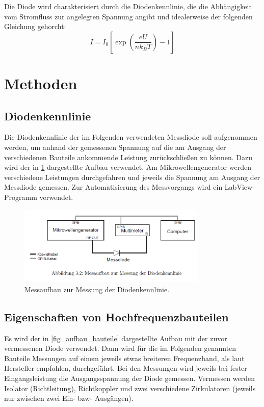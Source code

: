 \documentclass[
	a4paper,
	12pt,
	pagesize,
	ngerman
]{scrartcl}
\begin{document}
	Die Diode wird charakterisiert durch die Diodenkennlinie, die die Abhängigkeit vom Stromfluss zur angelegten Spannung angibt und idealerweise der folgenden Gleichung gehorcht:
	\begin{equation}
		\label{eq_diode_ideal}
		I = I_0 \left[ \exp \left( \frac{eU}{n k_B T} \right) -1 \right] %
	\end{equation}


	\section{Methoden}

	\subsection{Diodenkennlinie}
	Die Diodenkennlinie der im Folgenden verwendeten Messdiode soll aufgenommen werden, um anhand der gemessenen Spannung auf die am Ausgang der verschiedenen Bauteile ankommende Leistung zurückschließen zu können.
	Dazu wird der in \cref{fig_aufbau_kennlinie} dargestellte Aufbau verwendet.
	Am Mikrowellengenerator werden verschiedene Leistungen durchgefahren und jeweils die Spannung am Ausgang der Messdiode gemessen.
	Zur Automatisierung des Messvorgangs wird ein LabView-Programm verwendet.

	\begin{figure}[H]
		\includegraphics[width=0.8\textwidth]{img/aufbau_kennlinie.png}
		\centering
		\caption{
		 	Messaufbau zur Messung der Diodenkennlinie. \cite{Anleitung}
		}
		\label{fig_aufbau_kennlinie}
		\centering
	\end{figure}

	\subsection{Eigenschaften von Hochfrequenzbauteilen}

	Es wird der in \cref{fig_aufbau_bauteile} dargestellte Aufbau mit der zuvor vermessenen Diode verwendet.
	Dann wird für die im Folgenden genannten Bauteile Messungen auf einem jeweils etwas breiteren Frequenzband, als laut Hersteller empfohlen, durchgeführt.
  Bei den Messungen wird jeweils bei fester Eingangsleistung die Ausgangsspannung der Diode gemessen.
	Vermessen werden Isolator (Richtleitung), Richtkoppler und zwei verschiedene Zirkulatoren (jeweils nur zwischen zwei Ein- bzw- Ausgängen).
\end{document}
